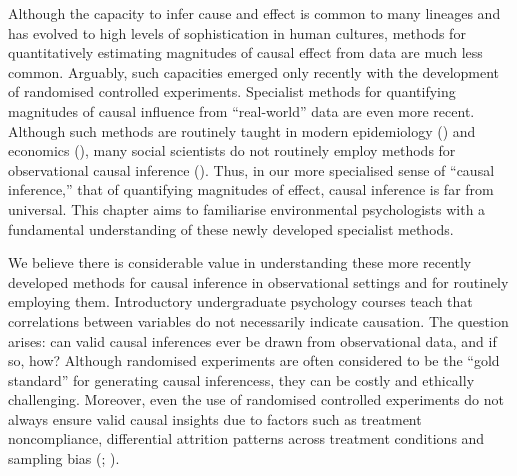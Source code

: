 \documentclass[
  singlecolumn]{article}
\begin{document}
Although the capacity to infer cause and effect is common to many
lineages and has evolved to high levels of sophistication in human
cultures, methods for quantitatively estimating magnitudes of causal
effect from data are much less common. Arguably, such capacities emerged
only recently with the development of randomised controlled experiments.
Specialist methods for quantifying magnitudes of causal influence from
``real-world'' data are even more recent. Although such methods are
routinely taught in modern epidemiology () and economics
(), many
social scientists do not routinely employ methods for observational
causal inference ().
Thus, in our more specialised sense of ``causal inference,'' that of
quantifying magnitudes of effect, causal inference is far from
universal. This chapter aims to familiarise environmental psychologists
with a fundamental understanding of these newly developed specialist
methods.

We believe there is considerable value in understanding these more
recently developed methods for causal inference in observational
settings and for routinely employing them. Introductory undergraduate
psychology courses teach that correlations between variables do not
necessarily indicate causation. The question arises: can valid causal
inferences ever be drawn from observational data, and if so, how?
Although randomised experiments are often considered to be the ``gold
standard'' for generating causal inferencess, they can be costly and
ethically challenging. Moreover, even the use of randomised controlled
experiments do not always ensure valid causal insights due to factors
such as treatment noncompliance, differential attrition patterns across
treatment conditions and sampling bias
(;
).
\end{document}

